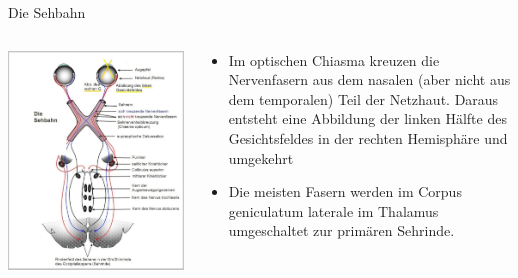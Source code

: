 \documentclass{beamer}
\begin{document}
\begin{frame}{Die Sehbahn}

\begin{columns}[c]

\begin{column}{6cm}
\begin{center}
        \includegraphics[width=\textwidth]{Sehbahn_mit_Chiasma_opticum.jpg}
\end{center}

\end{column}


\begin{column}{6cm}
\begin{itemize}
    \item 
    Im optischen Chiasma kreuzen die Nervenfasern aus dem nasalen (aber nicht aus dem temporalen) Teil der Netzhaut. Daraus entsteht eine Abbildung der linken Hälfte des Gesichtsfeldes in der rechten Hemisphäre und umgekehrt
    \pause
    \item
    Die meisten Fasern werden im Corpus geniculatum laterale im Thalamus umgeschaltet zur primären Sehrinde. 
    

\end{itemize}
\end{column}


\end{columns}

\end{frame}
\end{document}
